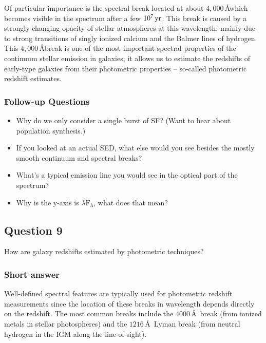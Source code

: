 \documentclass[a4paper,11pt]{article}
\begin{document}
{\noindent}Of particular importance is the spectral break located at about $4,000$\,\AA which becomes visible in the spectrum after a few $10^7\,{\rm yr}$. This break is caused by a strongly changing opacity of stellar atmospheres at this wavelength, mainly due to strong transitions of singly ionized calcium and the Balmer lines of hydrogen. This $4,000$\,\AA break is one of the most important spectral properties of the continuum stellar emission in galaxies; it allows us to estimate the redshifts of early-type galaxies from their photometric properties -- so-called photometric redshift estimates.

\subsubsection{Follow-up Questions}

\begin{itemize}
    \item Why do we only consider a single burst of SF? (Want to hear about population synthesis.)
    \item If you looked at an actual SED, what else would you see besides the mostly smooth continuum and spectral breaks?
    \item What's a typical emission line you would see in the optical part of the spectrum?
    \item Why is the y-axis is $\lambda\mathrm{F}_\lambda$, what does that mean?
\end{itemize}



\newpage
\subsection{Question 9}

How are galaxy redshifts estimated by photometric techniques?

\subsubsection{Short answer}

Well-defined spectral features are typically used for photometric redshift measurements since the location of these breaks in wavelength depends directly on the redshift. The most common breaks include the $4000$\,\AA~break (from ionized metals in stellar photospheres) and the $1216$\,\AA~Lyman break (from neutral hydrogen in the IGM along the line-of-sight).
\end{document}
